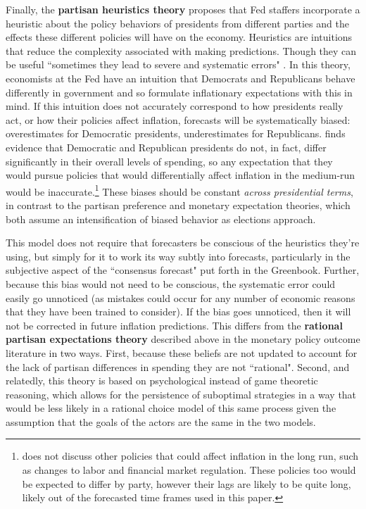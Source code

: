 \documentclass[a4paper]{article}\usepackage{graphicx, color}
\begin{document}
Finally, the {\bf{partisan heuristics theory}} proposes that Fed staffers incorporate a heuristic \citep[see][]{kahneman1973, tverskykahneman1974, kahneman2003} about the policy behaviors of presidents from different parties and the effects these different policies will have on the economy. Heuristics are intuitions that reduce the complexity associated with making predictions. Though they can be useful ``sometimes they lead to severe and systematic errors" \citep[][1124]{tverskykahneman1974}. In this theory, economists at the Fed have an intuition that Democrats and Republicans behave differently in government and so formulate inflationary expectations with this in mind. If this intuition does not accurately correspond to how presidents really act, or how their policies affect inflation, forecasts will be systematically biased: overestimates for Democratic presidents, underestimates for Republicans. \cite{Bartels2008} finds evidence that Democratic and Republican presidents do not, in fact, differ significantly in their overall levels of spending, so any expectation that they would pursue policies that would differentially affect inflation in the medium-run would be inaccurate.\footnote{\cite{Bartels2008} does not discuss other policies that could affect inflation in the long run, such as changes to labor and financial market regulation. These policies too would be expected to differ by party, however their lags are likely to be quite long, likely out of the forecasted time frames used in this paper.} These biases should be constant {\emph{across presidential terms}}, in contrast to the partisan preference and monetary expectation theories, which both assume an intensification of biased behavior as elections approach.

This model does not require that forecasters be conscious of the heuristics they're using, but simply for it to work its way subtly into forecasts, particularly in the subjective aspect of the ``consensus forecast" put forth in the Greenbook. Further, because this bias would not need to be conscious, the systematic error could easily go unnoticed (as mistakes could occur for any number of economic reasons that they have been trained to consider). If the bias goes unnoticed, then it will not be corrected in future inflation predictions. This differs from the {\bf{rational partisan expectations theory}} described above in the monetary policy outcome literature in two ways. First, because these beliefs are not updated to account for the lack of partisan differences in spending they are not ``rational". Second, and relatedly, this theory is based on psychological instead of game theoretic reasoning, which allows for the persistence of suboptimal strategies in a way that would be less likely in a rational choice model of this same process given the assumption that the goals of the actors are the same in the two models. 
\end{document}
